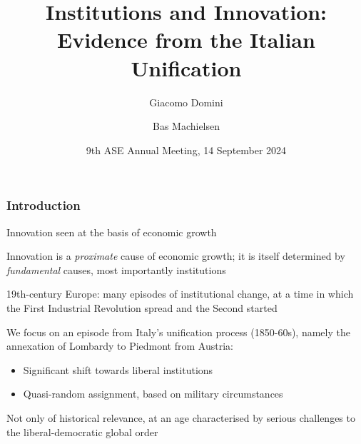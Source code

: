 \documentclass[10pt]{beamer}
\title[Institutions and innovation]{Institutions and Innovation: \\ Evidence from the Italian Unification}
\author[Domini \& Machielsen]{Giacomo Domini\inst{} 
    \and Bas Machielsen\inst{}}
\institute{
    \inst{} Utrecht University School of Economics}
\date[Sep 2024]{9th ASE Annual Meeting, 14 September 2024}
\begin{document}
\begin{frame}
  \titlepage
\end{frame}

\begin{frame}
    \frametitle{Introduction}
    
    Innovation seen at the basis of economic growth \citep{schumpeter1942, solow1957} \\  \bigskip
    
    Innovation is a \textit{proximate} cause of economic growth; it is itself determined by \textit{fundamental} causes, most importantly institutions \citep{acemoglu2005, north1973, north1990} \\    \bigskip
    
    \pause
    
    19th-century Europe: many episodes of institutional change, at a time in which the First Industrial Revolution spread and the Second  started \\    \bigskip

    We focus on an episode from Italy's unification process (1850-60s), namely the annexation of Lombardy to Piedmont from Austria:
    
    \begin{itemize}
        \item Significant shift towards liberal institutions
        \item Quasi-random assignment, based on military circumstances
    \end{itemize}

    \bigskip
    
    Not only of historical relevance, at an age characterised by serious challenges to the liberal-democratic global order 
    
\end{frame}
\end{document}
